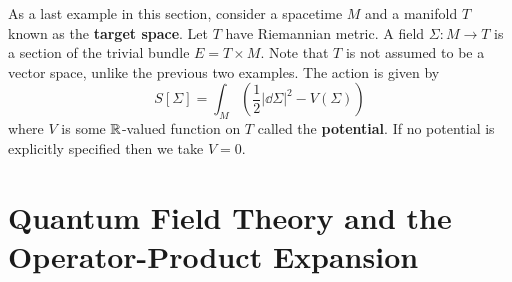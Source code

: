 	\begin{eg}
		As a last example in this section, consider a spacetime $M$ and a manifold $T$ known as the \textbf{target space}. Let $T$ have Riemannian metric. A field $\Sigma: M \to T$ is a section of the trivial bundle $E = T \times M$. Note that $T$ is not assumed to be a vector space, unlike the previous two examples. The action is given by
		\[
			S[\Sigma] = \int_M \left(\frac12 |\dd\Sigma|^2 - V(\Sigma) \right)
		\]
		where $V$ is some $\mathbb{R}$-valued function on $T$ called the \textbf{potential}. If no potential is explicitly specified then we take $V = 0$.
	\end{eg}
	
	\section{Quantum Field Theory and the Operator-Product Expansion} %
	\label{sec:quantum_field_theory_and_the_operator_product_expansion}
	
